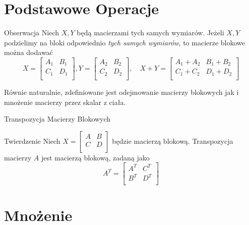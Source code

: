 \documentclass{beamer}
\begin{document}
\section{Podstawowe Operacje} 

\begin{frame}
    \begin{block}{Obserwacja}
        Niech $X,Y$ będą macierzami tych samych wymiarów. Jeżeli $X,Y$ podzielimy na bloki 
        odpowiednio \textit{tych samych wymiarów}, to macierze blokowe można dodawać
        $$X = \begin{bmatrix}
            A_1 & B_1 \\ C_1 & D_1 \\
        \end{bmatrix},
        Y = \begin{bmatrix}
            A_2& B_2 \\ C_2 & D_2 \\
        \end{bmatrix}, \quad 
        X + Y = \begin{bmatrix}
            A_1 + A_2 & B_1 + B_2 \\ C_1 + C_2 & D_1 + D_2 \\ 
        \end{bmatrix}$$
    \end{block}
    Równie naturalnie, zdefiniowane jest odejmowanie macierzy blokowych jak i mnożenie macierzy przez skalar z ciała.
\end{frame}

\begin{frame}{Transpozycja Macierzy Blokowych}
    \begin{block}{Twierdzenie}
        Niech $X = \begin{bmatrix}
            A & B \\ C & D \\
        \end{bmatrix}$
        będzie macierzą blokową. Transpozycja macierzy $A$ jest macierzą blokową, zadaną jako $$A^T = \begin{bmatrix}
            A^T & C^T \\ B^T & D^T \\   
        \end{bmatrix} $$
    \end{block}
\end{frame}

\section{Mnożenie}
\end{document}
